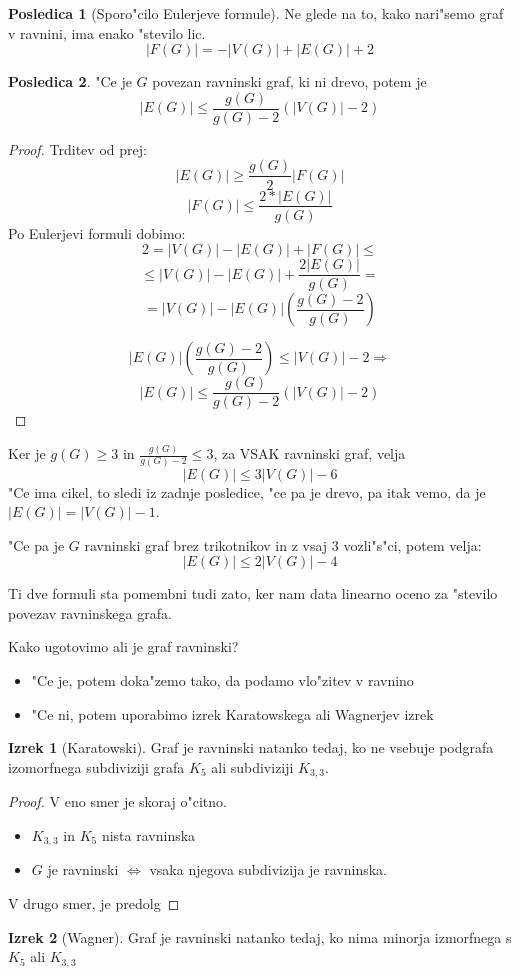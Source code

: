 \documentclass{article}
\theoremstyle{definition}
\newtheorem{conseq}{Posledica}[section]
\newtheorem{theorem}{Izrek}[section]
\begin{document}
	\begin{conseq}[Sporo"cilo Eulerjeve formule]
		Ne glede na to, kako nari"semo graf v ravnini, ima enako "stevilo lic.
		$$ |F(G)| = - |V(G)| + |E(G)| + 2 $$
	\end{conseq}
	
	\begin{conseq}
		"Ce je $G$ povezan ravninski graf, ki ni drevo, potem je
		$$ |E(G)| \leq \frac{g(G)}{g(G)-2}(|V(G)|-2) $$
		\begin{proof}
			Trditev od prej:
			$$ |E(G)| \geq \frac{g(G)}{2}|F(G)| $$
			$$ |F(G)| \leq \frac{2*|E(G)|}{g(G)} $$
			Po Eulerjevi formuli dobimo:
			$$ 2 = |V(G)| - |E(G)| + |F(G)| \leq $$
			$$ \leq |V(G)| - |E(G)| + \frac{2|E(G)|}{g(G)} = $$
			$$ = |V(G)| - |E(G)|(\frac{g(G)-2}{g(G)}) $$
			
			$$ |E(G)|(\frac{g(G)-2}{g(G)}) \leq |V(G)| -2 \Rightarrow $$
			$$ |E(G)| \leq \frac{g(G)}{g(G)-2}(|V(G)|-2) $$
		\end{proof}
	\end{conseq}
	
	Ker je $g(G) \geq 3$ in $\frac{g(G)}{g(G)-2} \leq 3$, za VSAK ravninski graf, velja
	$$ |E(G)| \leq 3|V(G)|-6 $$
	"Ce ima cikel, to sledi iz zadnje posledice, "ce pa je drevo, pa itak vemo, da je $|E(G)| = |V(G)| - 1$.
	
	"Ce pa je $G$ ravninski graf brez trikotnikov in z vsaj 3 vozli"s"ci, potem velja:
	$$ |E(G)| \leq 2|V(G)| - 4 $$
	
	Ti dve formuli sta pomembni tudi zato, ker nam data linearno oceno za "stevilo povezav ravninskega grafa.
	
	
	Kako ugotovimo ali je graf ravninski?
	\begin{itemize}
		\item "Ce je, potem doka"zemo tako, da podamo vlo"zitev v ravnino
		\item "Ce ni, potem uporabimo izrek Karatowskega ali Wagnerjev izrek
	\end{itemize}
	\begin{theorem}[Karatowski]
		Graf je ravninski natanko tedaj, ko ne vsebuje podgrafa izomorfnega subdiviziji grafa $K_5$ ali subdiviziji $K_{3,3}$.
		\begin{proof}
			V eno smer je skoraj o"citno.
			\begin{itemize}
				\item $K_{3,3}$ in $K_5$ nista ravninska
				\item $G$ je ravninski $\iff$ vsaka njegova subdivizija je ravninska.
			\end{itemize}
			V drugo smer, je predolg %
		\end{proof}
	\end{theorem}
	\begin{theorem}[Wagner]
		Graf je ravninski natanko tedaj, ko nima minorja izmorfnega s $K_5$ ali $K_{3,3}$
	\end{theorem}
\end{document}
